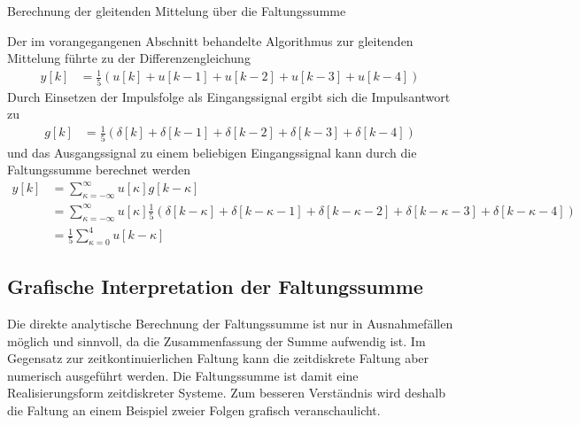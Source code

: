 \begin{example}{Berechnung der gleitenden Mittelung über die Faltungssumme}
\label{example:beispiel-berechnung-der-gleitenden-mittelung-uxfcber-die-faltungssumme}

Der im vorangegangenen Abschnitt behandelte Algorithmus zur gleitenden Mittelung führte zu der Differenzengleichung
\begin{align*}
y[ k] &= \frac{1}{5}  \left( u[ k] + u[ k - 1] + u[ k - 2] + u[ k - 3] + u[ k - 4] \right) 
\end{align*}
Durch Einsetzen der Impulsfolge als Eingangssignal ergibt sich die Impulsantwort zu
\begin{align*}
g[ k] &= \frac{1}{5}  \left( \delta[ k] + \delta[ k - 1] + \delta[ k - 2] + \delta[ k - 3] + \delta[ k - 4] \right) 
\end{align*}
und das Ausgangssignal zu einem beliebigen Eingangssignal kann durch die Faltungssumme berechnet werden
\begin{align*}
{y\left[k\right]} &=  {\sum\limits _{\kappa =-\infty }^{\infty }u\left[\kappa \right] g\left[k-\kappa \right] } \\
{} &=  {\sum\limits _{\kappa =-\infty }^{\infty }u\left[\kappa \right] \frac{1}{5}  \left(\delta \left[k-\kappa \right]+\delta \left[k-\kappa -1\right]+\delta \left[k-\kappa -2\right]+\delta \left[k-\kappa -3\right]+\delta \left[k-\kappa -4\right]\right) } \\
{} &=  {\frac{1}{5}  \sum\limits _{\kappa =0}^{4}u\left[k-\kappa \right] }
\end{align*}
\end{example}

\subsection{Grafische Interpretation der Faltungssumme}\label{sec:grafische-interpretation-der-faltungssumme}

Die direkte analytische Berechnung der Faltungssumme ist nur in Ausnahmefällen möglich und sinnvoll, da die Zusammenfassung der Summe aufwendig ist. Im Gegensatz zur zeitkontinuierlichen Faltung kann die zeitdiskrete Faltung aber numerisch ausgeführt werden. Die Faltungssumme ist damit eine Realisierungsform zeitdiskreter Systeme. Zum besseren Verständnis wird deshalb die Faltung an einem Beispiel zweier Folgen grafisch veranschaulicht.

